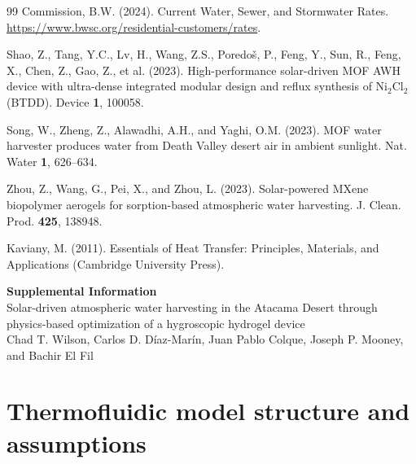 \documentclass[11pt]{article}
\begin{document}
\begin{thebibliography}{99}
 Commission, B.W. (2024). Current Water, Sewer, and Stormwater Rates. \url{https://www.bwsc.org/residential-customers/rates}.

 Shao, Z., Tang, Y.C., Lv, H., Wang, Z.S., Poredo\v{s}, P., Feng, Y., Sun, R., Feng, X., Chen, Z., Gao, Z., et al. (2023). High-performance solar-driven MOF AWH device with ultra-dense integrated modular design and reflux synthesis of Ni$_2$Cl$_2$(BTDD). Device \textbf{1}, 100058.

 Song, W., Zheng, Z., Alawadhi, A.H., and Yaghi, O.M. (2023). MOF water harvester produces water from Death Valley desert air in ambient sunlight. Nat. Water \textbf{1}, 626--634.

 Zhou, Z., Wang, G., Pei, X., and Zhou, L. (2023). Solar-powered MXene biopolymer aerogels for sorption-based atmospheric water harvesting. J. Clean. Prod. \textbf{425}, 138948.

 Kaviany, M. (2011). Essentials of Heat Transfer: Principles, Materials, and Applications (Cambridge University Press).

\end{thebibliography}

\clearpage
\appendix
\renewcommand{\thesection}{S\arabic{section}}
\setcounter{section}{0}
\renewcommand{\thefigure}{S\arabic{figure}}
\renewcommand{\thetable}{S\arabic{table}}
\renewcommand{\theequation}{S\arabic{equation}}
\setcounter{figure}{0}
\setcounter{table}{0}
\setcounter{equation}{0}

\begin{center}
{\LARGE \textbf{Supplemental Information}} \\[6pt]
{\large Solar-driven atmospheric water harvesting in the Atacama Desert through physics-based optimization of a hygroscopic hydrogel device}\\[6pt]
Chad T. Wilson, Carlos D. D{\'i}az-Mar{\'i}n, Juan Pablo Colque, Joseph P. Mooney, and Bachir El Fil
\end{center}

\section{Thermofluidic model structure and assumptions}
\end{document}
